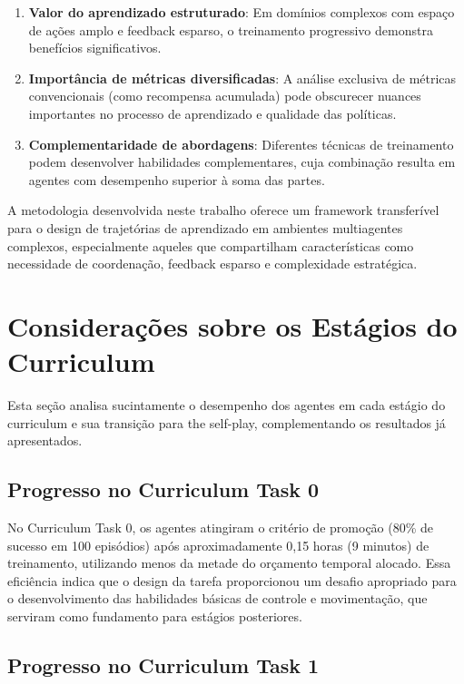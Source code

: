 \begin{enumerate}
    \item \textbf{Valor do aprendizado estruturado}: Em domínios complexos com espaço de ações amplo e feedback esparso, o treinamento progressivo demonstra benefícios significativos.
    
    \item \textbf{Importância de métricas diversificadas}: A análise exclusiva de métricas convencionais (como recompensa acumulada) pode obscurecer nuances importantes no processo de aprendizado e qualidade das políticas.
    
    \item \textbf{Complementaridade de abordagens}: Diferentes técnicas de treinamento podem desenvolver habilidades complementares, cuja combinação resulta em agentes com desempenho superior à soma das partes.
\end{enumerate}

A metodologia desenvolvida neste trabalho oferece um framework transferível para o design de trajetórias de aprendizado em ambientes multiagentes complexos, especialmente aqueles que compartilham características como necessidade de coordenação, feedback esparso e complexidade estratégica.

\section{Considerações sobre os Estágios do Curriculum}
\label{sec:analise_estagios}

Esta seção analisa sucintamente o desempenho dos agentes em cada estágio do curriculum e sua transição para the self-play, complementando os resultados já apresentados.

\subsection{Progresso no Curriculum Task 0}

No Curriculum Task 0, os agentes atingiram o critério de promoção (80\% de sucesso em 100 episódios) após aproximadamente 0,15 horas (9 minutos) de treinamento, utilizando menos da metade do orçamento temporal alocado. Essa eficiência indica que o design da tarefa proporcionou um desafio apropriado para o desenvolvimento das habilidades básicas de controle e movimentação, que serviram como fundamento para estágios posteriores.

\subsection{Progresso no Curriculum Task 1}

